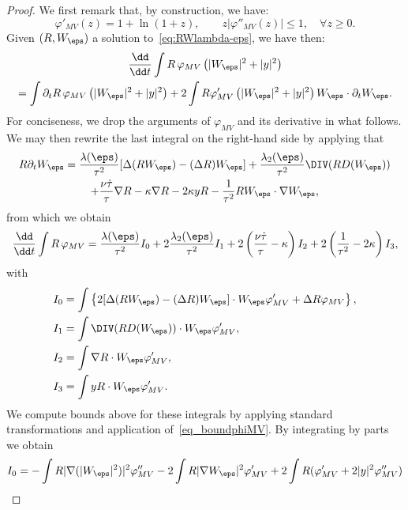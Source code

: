\begin{proof}
We first remark that, by construction, we have:
\begin{equation}\label{eq_boundphiMV}
\varphi'_{MV}(z) = 1 + \ln(1+{z}), \qquad z |\varphi''_{MV}(z)| \le 1,
\quad \forall z \ge 0.
\end{equation}
Given $(R,W_\eps)$ a solution to~\eqref{eq:RWlambda-eps}, we have then:
\begin{multline*}
\dfrac{\dd }{\dd t}\int R \, \varphi_{MV}\left(|W_\eps|^2+ |y|^2\right)
\\
= \int \partial_t R \, \varphi_{MV}\left(|W_\eps|^2+ |y|^2\right) + 2\int R \varphi'_{MV}\left(|W_\eps|^2 + |y|^2\right) W_\eps \cdot \partial_t W_\eps.
\end{multline*}
For conciseness, we drop the arguments of $\varphi_{MV}$ and its derivative in what follows. We may then rewrite the last integral on the right-hand side by applying that
\begin{multline*}
R \partial_t W_\eps =\dfrac{\lambda(\eps)}{\tau^2} [\Delta (R W_\eps) - (\Delta R) W_\eps] +\dfrac{\lambda_2(\eps)}{\tau^2}\DIV (R D(W_\eps)) \\
+ \dfrac{\nu \dot{\tau}}{\tau} \nabla R - \kappa \nabla R - 2\kappa y R - \dfrac{1}{\tau^2} R W_\eps \cdot \nabla W_\eps,
\end{multline*}
from which we obtain
\begin{equation}\label{eq_debase}
\dfrac{\dd }{\dd t}\int R \, \varphi_{MV} = \dfrac{\lambda(\eps)}{\tau^2} I_0 +2\dfrac{\lambda_2(\eps)}{\tau^2} I_1 + 2\left(\dfrac{\nu \dot{\tau}}{\tau} - \kappa\right) I_2 + 2\left(\dfrac{1}{\tau^2} - 2 \kappa \right) I_3,
\end{equation}
with
\begin{align*}
I_0 &= \int \left\{ 2[\Delta (R W_\eps) - (\Delta R) W_\eps]\cdot W_\eps \varphi'_{MV} + \Delta R \varphi_{MV} \right\},\\
I_1 & = \int \DIV (R D(W_\eps)) \cdot W_\eps \varphi'_{MV},\\
I_2 & = \int \nabla R \cdot W_\eps \varphi'_{MV}, \\
I_3 & = \int y R \cdot W_\eps \varphi'_{MV}.
\end{align*}
We compute bounds above for these integrals by applying standard transformations and application of~\eqref{eq_boundphiMV}. By integrating by parts we obtain
\begin{align*}
I_0 & = - \int R |\nabla (|W_\eps|^2)|^2 \varphi''_{MV} - 2\int R |\nabla W_\eps|^2 \varphi'_{MV} + 2\int R (\varphi'_{MV} + 2|y|^2 \varphi''_{MV}) \\

\end{align*}
\end{proof}
